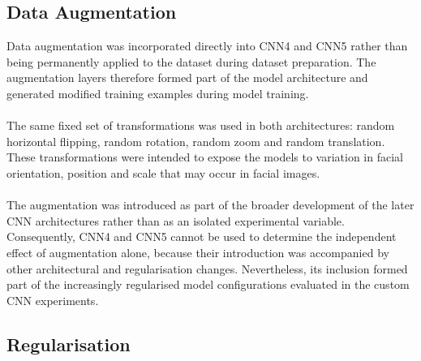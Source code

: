 \documentclass[12pt, a4paper]{report}
\let\oldsubsection\subsection
\renewcommand{\subsection}{%
    \Needspace{6\baselineskip}%
    \oldsubsection
}
\begin{document}
			\subsection{Data Augmentation}
				
				Data augmentation was incorporated directly into CNN4 and CNN5 rather than being permanently applied to the dataset during dataset preparation. The augmentation layers therefore formed part of the model architecture and generated modified training examples during model training.\\\\
				The same fixed set of transformations was used in both architectures: random horizontal flipping, random rotation, random zoom and random translation. These transformations were intended to expose the models to variation in facial orientation, position and scale that may occur in facial images.\\\\
				The augmentation was introduced as part of the broader development of the later CNN architectures rather than as an isolated experimental variable. Consequently, CNN4 and CNN5 cannot be used to determine the independent effect of augmentation alone, because their introduction was accompanied by other architectural and regularisation changes. Nevertheless, its inclusion formed part of the increasingly regularised model configurations evaluated in the custom CNN experiments.
				
			\subsection{Regularisation}
				
\end{document}
